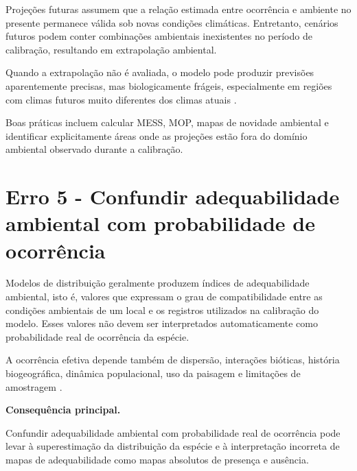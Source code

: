 \documentclass{ueap-sdm}
\begin{document}
Projeções futuras assumem que a relação estimada entre ocorrência e ambiente
no presente permanece válida sob novas condições climáticas. Entretanto,
cenários futuros podem conter combinações ambientais inexistentes no período de
calibração, resultando em extrapolação ambiental.

Quando a extrapolação não é avaliada, o modelo pode produzir previsões
aparentemente precisas, mas biologicamente frágeis, especialmente em regiões
com climas futuros muito diferentes dos climas atuais
\citep{elith2010functional, owens2013constraints, zurell2020standard}.

\begin{center}
\end{center}

Boas práticas incluem calcular MESS, MOP, mapas de novidade ambiental e
identificar explicitamente áreas onde as projeções estão fora do domínio
ambiental observado durante a calibração.

\section{Erro 5 - Confundir adequabilidade ambiental com probabilidade de ocorrência}

Modelos de distribuição geralmente produzem índices de adequabilidade
ambiental, isto é, valores que expressam o grau de compatibilidade entre as
condições ambientais de um local e os registros utilizados na calibração do
modelo. Esses valores não devem ser interpretados automaticamente como
probabilidade real de ocorrência da espécie.

A ocorrência efetiva depende também de dispersão, interações bióticas,
história biogeográfica, dinâmica populacional, uso da paisagem e limitações de
amostragem \citep{soberon2007grinnellian, franklin2010mapping,
	peterson2011ecological}.

\begin{sdmwarningbox}
	\textbf{Consequência principal.}
	
	Confundir adequabilidade ambiental com probabilidade real de ocorrência pode
	levar à superestimação da distribuição da espécie e à interpretação incorreta
	de mapas de adequabilidade como mapas absolutos de presença e ausência.
\end{sdmwarningbox}
\end{document}
